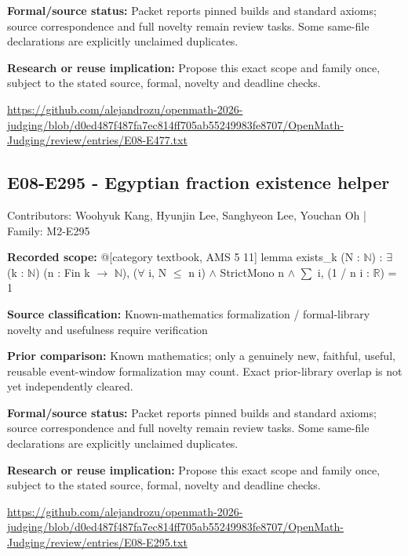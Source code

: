 \documentclass[11pt,a4paper]{article}
\begin{document}
\textbf{Formal/source status:} Packet reports pinned builds and standard axioms; source correspondence and full novelty remain review tasks. Some same-file declarations are explicitly unclaimed duplicates.

\textbf{Research or reuse implication:} Propose this exact scope and family once, subject to the stated source, formal, novelty and deadline checks.

{\small \url{https://github.com/alejandrozu/openmath-2026-judging/blob/d0ed487f487fa7ec814ff705ab55249983fe8707/OpenMath-Judging/review/entries/E08-E477.txt}\par}

\begin{samepage}
\subsection{E08-E295  -  Egyptian fraction existence helper}
{\small Contributors: Woohyuk Kang, Hyunjin Lee, Sanghyeon Lee, Youchan Oh | Family: M2-E295\par}

\textbf{Recorded scope:} @[category textbook, AMS 5 11] lemma exists\_k (N : \ensuremath{\mathbb{N}}) : \ensuremath{\exists} (k : \ensuremath{\mathbb{N}}) (n : Fin k \ensuremath{\to} \ensuremath{\mathbb{N}}), (\ensuremath{\forall} i, N \ensuremath{\leq} n i) \ensuremath{\wedge} StrictMono n \ensuremath{\wedge} \ensuremath{\sum} i, (1 / n i : \ensuremath{\mathbb{R}}) = 1


\end{samepage}
\textbf{Source classification:} Known-mathematics formalization / formal-library novelty and usefulness require verification

\textbf{Prior comparison:} Known mathematics; only a genuinely new, faithful, useful, reusable event-window formalization may count. Exact prior-library overlap is not yet independently cleared.

\textbf{Formal/source status:} Packet reports pinned builds and standard axioms; source correspondence and full novelty remain review tasks. Some same-file declarations are explicitly unclaimed duplicates.

\textbf{Research or reuse implication:} Propose this exact scope and family once, subject to the stated source, formal, novelty and deadline checks.

{\small \url{https://github.com/alejandrozu/openmath-2026-judging/blob/d0ed487f487fa7ec814ff705ab55249983fe8707/OpenMath-Judging/review/entries/E08-E295.txt}\par}
\end{document}
